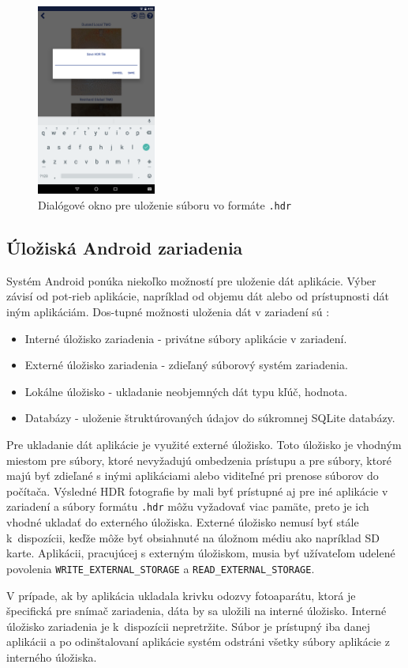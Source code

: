 \begin{figure}[h!]
  \centering
  \includegraphics[width=0.35\textwidth]{figures/storage/dialogs/saveHdr}
  \caption{Dialógové okno pre uloženie súboru vo formáte \texttt{.hdr}}
  \label{fig:saveDialog}
\end{figure}

\subsection*{Úložiská Android zariadenia}

Systém Android ponúka niekoľko možností pre uloženie dát aplikácie. Výber závisí od pot-rieb aplikácie, napríklad
od objemu dát alebo od prístupnosti dát iným aplikáciám. Dos-tupné možnosti uloženia dát v zariadení sú \cite{Android}:
\begin{itemize}
  \item Interné úložisko zariadenia - privátne súbory aplikácie v zariadení.
  \item Externé úložisko zariadenia - zdieľaný súborový systém zariadenia.
  \item Lokálne úložisko - ukladanie neobjemných dát typu kľúč, hodnota.
  \item Databázy - uloženie štruktúrovaných údajov do súkromnej SQLite databázy.
\end{itemize}

Pre ukladanie dát aplikácie je využité externé úložisko. Toto úložisko je vhodným miestom pre súbory, ktoré
nevyžadujú ombedzenia prístupu a pre súbory, ktoré majú byť zdieľané s inými aplikáciami alebo viditeľné pri
prenose súborov do počítača. Výsledné HDR fotografie by mali byť prístupné aj pre iné aplikácie v zariadení
a súbory formátu \texttt{.hdr} môžu vyžadovať viac pamäte, preto je ich vhodné ukladať do externého úložiska. 
Externé úložisko nemusí byť stále k~dispozícii, keďže môže byť obsiahnuté na úložnom médiu ako napríklad SD karte.
Aplikácii, pracujúcej s externým úložiskom, musia byť užívateľom udelené povolenia \texttt{WRITE\_EXTERNAL\_STORAGE} 
a \texttt{READ\_EXTERNAL\_STORAGE}.

V prípade, ak by aplikácia ukladala krivku odozvy fotoaparátu, ktorá je špecifická pre snímač zariadenia, dáta
by sa uložili na interné úložisko. Interné úložisko zariadenia je k~dispozícii nepretržite. Súbor je prístupný
iba danej aplikácii a po odinštalovaní aplikácie systém odstráni všetky súbory aplikácie z interného úložiska.